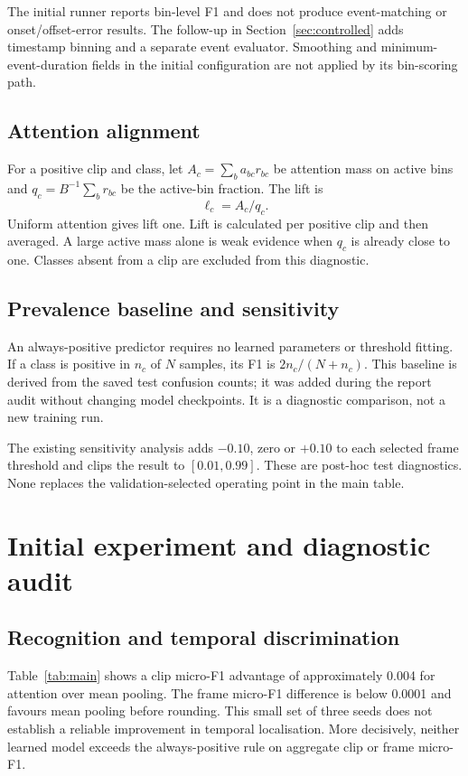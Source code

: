 \documentclass[10pt,a4paper]{article}
\begin{document}
The initial runner reports bin-level F1 and does not produce event-matching or onset/offset-error results. The follow-up in Section~\ref{sec:controlled} adds timestamp binning and a separate event evaluator. Smoothing and minimum-event-duration fields in the initial configuration are not applied by its bin-scoring path.

\subsection{Attention alignment}
For a positive clip and class, let $A_c=\sum_b a_{bc}r_{bc}$ be attention mass on active bins and $q_c=B^{-1}\sum_b r_{bc}$ be the active-bin fraction. The lift is
\begin{equation}\ell_c=A_c/q_c.
\end{equation}
Uniform attention gives lift one. Lift is calculated per positive clip and then averaged. A large active mass alone is weak evidence when $q_c$ is already close to one. Classes absent from a clip are excluded from this diagnostic.

\subsection{Prevalence baseline and sensitivity}
An always-positive predictor requires no learned parameters or threshold fitting. If a class is positive in $n_c$ of $N$ samples, its F1 is $2n_c/(N+n_c)$. This baseline is derived from the saved test confusion counts; it was added during the report audit without changing model checkpoints. It is a diagnostic comparison, not a new training run.

The existing sensitivity analysis adds $-0.10$, zero or $+0.10$ to each selected frame threshold and clips the result to $[0.01,0.99]$. These are post-hoc test diagnostics. None replaces the validation-selected operating point in the main table.

\section{Initial experiment and diagnostic audit}

\subsection{Recognition and temporal discrimination}
Table~\ref{tab:main} shows a clip micro-F1 advantage of approximately 0.004 for attention over mean pooling. The frame micro-F1 difference is below 0.0001 and favours mean pooling before rounding. This small set of three seeds does not establish a reliable improvement in temporal localisation. More decisively, neither learned model exceeds the always-positive rule on aggregate clip or frame micro-F1.
\end{document}
